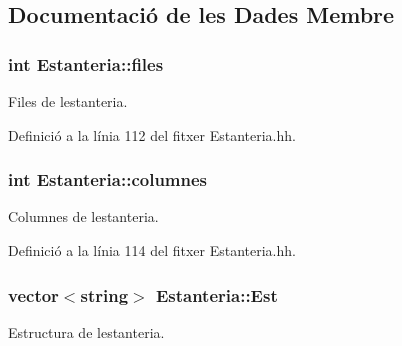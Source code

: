 \subsection{Documentació de les Dades Membre}
\subsubsection[{\texorpdfstring{files}{files}}]{\setlength{\rightskip}{0pt plus 5cm}int Estanteria\+::files\hspace{0.3cm}{\ttfamily [private]}}\hypertarget{class_estanteria_a649ad0331b78ba3c056fd9c42f0d26fe}{}\label{class_estanteria_a649ad0331b78ba3c056fd9c42f0d26fe}


Files de l\textquotesingle{}estanteria. 



Definició a la línia 112 del fitxer Estanteria.\+hh.

\subsubsection[{\texorpdfstring{columnes}{columnes}}]{\setlength{\rightskip}{0pt plus 5cm}int Estanteria\+::columnes\hspace{0.3cm}{\ttfamily [private]}}\hypertarget{class_estanteria_afd7a5087a18c8481060aef57ca8cbf78}{}\label{class_estanteria_afd7a5087a18c8481060aef57ca8cbf78}


Columnes de l\textquotesingle{}estanteria. 



Definició a la línia 114 del fitxer Estanteria.\+hh.

\subsubsection[{\texorpdfstring{Est}{Est}}]{\setlength{\rightskip}{0pt plus 5cm}vector$<$string$>$ Estanteria\+::\+Est\hspace{0.3cm}{\ttfamily [private]}}\hypertarget{class_estanteria_a4ed61c91fcad6b38af067a4be8233097}{}\label{class_estanteria_a4ed61c91fcad6b38af067a4be8233097}


Estructura de l\textquotesingle{}estanteria. 



